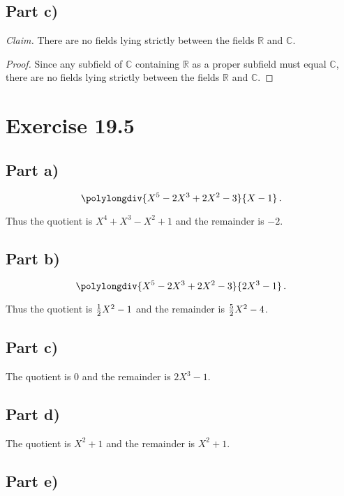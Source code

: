 \documentclass{abrice}
\newcommand{\R}{\mathbb{R}}
\renewcommand{\C}{\mathbb{C}}
\begin{document}
\subsection{Part c)}

\emph{Claim.} There are no fields lying strictly between the fields $\R$ and
$\C$.

\begin{proof}
  Since any subfield of $\C$ containing $\R$ as a proper subfield must equal
  $\C$, there are no fields lying strictly between the fields $\R$ and $\C$.
\end{proof}

\section{Exercise 19.5}

\subsection{Part a)}

\[
\polylongdiv{X^5 - 2X^3 + 2X^2 - 3}{X - 1}\, .
\]

Thus the quotient is $X^4 + X^3 - X^2 + 1$ and the remainder is $-2$.

\subsection{Part b)}

\[
\polylongdiv{X^5 - 2X^3 + 2X^2 - 3}{2X^3 - 1}\, .
\]

Thus the quotient is ${1 \over 2} X^2 - 1$ and the remainder is ${5 \over 2} X^2
- 4$.

\subsection{Part c)}

The quotient is $0$ and the remainder is $2X^3 - 1$.

\subsection{Part d)}

The quotient is $X^2 + 1$ and the remainder is $X^2 + 1$.

\subsection{Part e)}
\end{document}
